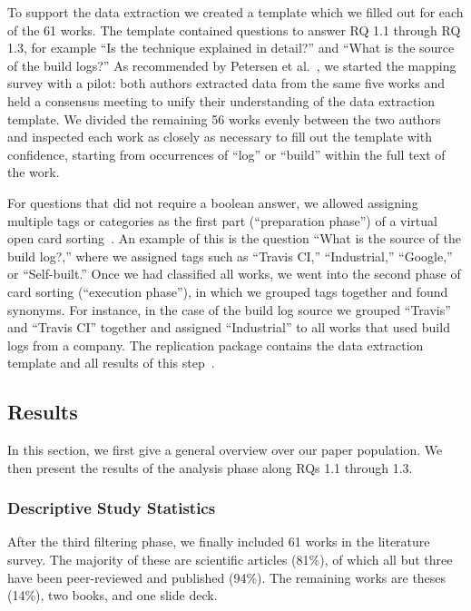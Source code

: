 To support the data extraction we created a template which we filled out
for each of the 61 works.
The template contained questions to answer RQ 1.1 through RQ 1.3,
for example ``Is the technique explained in detail?'' and
``What is the source of the build logs?''
As recommended by Petersen et
al.~\cite{petersen2015guidelines}, we started the mapping survey with a
pilot:
both authors extracted data from the same five works and held a
consensus meeting to unify their understanding
of the data extraction template.
We divided the remaining 56 works evenly between the two authors
and inspected each work as closely as necessary to fill out the
template
with confidence,
starting from occurrences of ``log'' or ``build'' within the full
text of the work.

For questions that did not require a boolean answer, we allowed assigning
multiple tags or categories as the first part (``preparation phase'')
of a virtual open card sorting~\cite{zimmermann2016card}.
An example of this is the question ``What is the source of the build
log?,''
where we assigned tags such as ``Travis CI,''
``Industrial,'' ``Google,'' or
``Self-built.''
Once we had classified all works, we went into the second phase of
card sorting
(``execution phase''), in which we grouped tags
together and found synonyms.
For instance, in the case of the build log source we grouped
``Travis'' and ``Travis CI'' together and assigned ``Industrial'' to
all works that used build logs from a company.
The replication package contains the data extraction template and all
results of this step~\cite{brandt2020chunk-replication}.


\subsection{Results}
\addtolength{\tabcolsep}{-5pt}

In this section, we first give a general overview over our paper population.
We then present the results of the analysis phase along RQs 1.1 through
1.3.


\subsubsection{Descriptive Study Statistics}
After the third filtering phase, we finally included 61 works in the
literature survey.
The majority of these are scientific articles (81\%), of which all but
three have been peer-reviewed and published (94\%).
The remaining works are theses (14\%), two books, and one slide deck.

